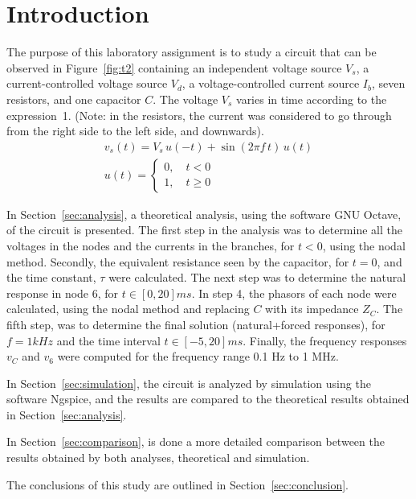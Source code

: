 \section{Introduction}
\label{sec:introduction}

The purpose of this laboratory assignment is to study a circuit that can be observed in Figure~\ref{fig:t2} containing an independent voltage source $V_s$, a current-controlled voltage source $V_d$, a voltage-controlled current source $I_b$,  seven resistors, and one capacitor $C$. The voltage $V_s$ varies in time according to the expression~1. (Note: in the resistors, the current was considered to go through from the right side to the left side, and downwards).
\begin{gather}\label{eq:vs}
    v_s(t) = V_s\,u(-t) + \sin(2\pi f\,t)\,u(t) \\
    u(t) =
    \begin{cases}
    0,\quad t<0\\
    1,\quad t\geqslant 0
    \end{cases}
\end{gather}


In Section~\ref{sec:analysis}, a theoretical analysis, using the software GNU Octave, of the circuit is presented. The first step in the analysis was to determine all the voltages in the nodes and the currents in the branches, for $t<0$, using the nodal method. Secondly, the equivalent resistance seen by the capacitor, for $t=0$, and the time constant, $\tau$ were calculated. The next step was to determine the natural response in node 6, for $t\in [0,20]ms$. In step 4, the phasors of each node were calculated, using the nodal method and replacing $C$ with its impedance $Z_C$. The fifth step, was to determine the final solution (natural+forced responses), for $f=1kHz$ and the time interval $t\in [-5,20]ms$. Finally, the frequency responses $v_C$ and $v_6$ were computed for the frequency range 0.1 Hz to 1 MHz.

In Section~\ref{sec:simulation}, the circuit is analyzed by
simulation using the software Ngspice, and the results are compared to the theoretical results obtained in
Section~\ref{sec:analysis}. 

In Section~\ref{sec:comparison}, is done a more detailed comparison between the results obtained by both analyses, theoretical and simulation.

The conclusions of this study are outlined in
Section~\ref{sec:conclusion}.

